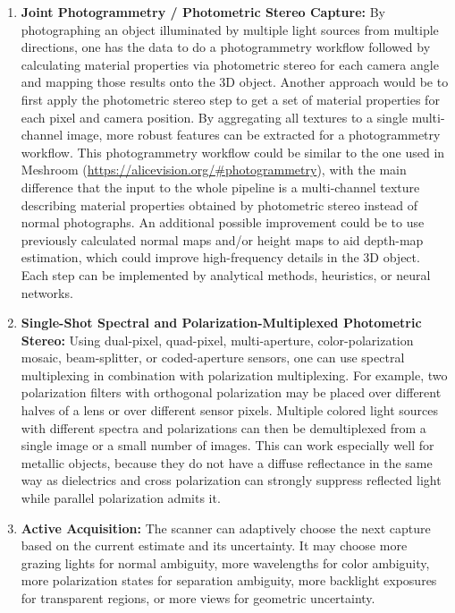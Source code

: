\documentclass[11pt, twoside, listof=totocnumbered, bibliography=totocnumbered]{scrartcl}
\begin{document}
\begin{enumerate}
		\item \textbf{Joint Photogrammetry / Photometric Stereo Capture:} By photographing an object illuminated by multiple light sources from multiple directions, one has the data to do a photogrammetry workflow followed by calculating material properties via photometric stereo for each camera angle and mapping those results onto the 3D object. Another approach would be to first apply the photometric stereo step to get a set of material properties for each pixel and camera position. By aggregating all textures to a single multi-channel image, more robust features can be extracted for a photogrammetry workflow. This photogrammetry workflow could be similar to the one used in Meshroom (\href{https://alicevision.org/\#photogrammetry}{https://alicevision.org/\#photogrammetry}), with the main difference that the input to the whole pipeline is a multi-channel texture describing material properties obtained by photometric stereo instead of normal photographs. An additional possible improvement could be to use previously calculated normal maps and/or height maps to aid depth-map estimation, which could improve high-frequency details in the 3D object. Each step can be implemented by analytical methods, heuristics, or neural networks.
		
		\item \textbf{Single-Shot Spectral and Polarization-Multiplexed Photometric Stereo:} Using dual-pixel, quad-pixel, multi-aperture, color-polarization mosaic, beam-splitter, or coded-aperture sensors, one can use spectral multiplexing in combination with polarization multiplexing. For example, two polarization filters with orthogonal polarization may be placed over different halves of a lens or over different sensor pixels. Multiple colored light sources with different spectra and polarizations can then be demultiplexed from a single image or a small number of images. This can work especially well for metallic objects, because they do not have a diffuse reflectance in the same way as dielectrics and cross polarization can strongly suppress reflected light while parallel polarization admits it.
		
		\item \textbf{Active Acquisition:} The scanner can adaptively choose the next capture based on the current estimate and its uncertainty. It may choose more grazing lights for normal ambiguity, more wavelengths for color ambiguity, more polarization states for separation ambiguity, more backlight exposures for transparent regions, or more views for geometric uncertainty.
		

\end{enumerate}
\end{document}
